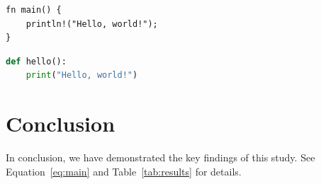\documentclass{article}
\begin{document}
\begin{verbatim}
fn main() {
    println!("Hello, world!");
}
\end{verbatim}

\begin{lstlisting}[language=Python]
def hello():
    print("Hello, world!")
\end{lstlisting}

\section{Conclusion}

In conclusion, we have demonstrated the key findings of this study.
See Equation~\ref{eq:main} and Table~\ref{tab:results} for details.
\end{document}

